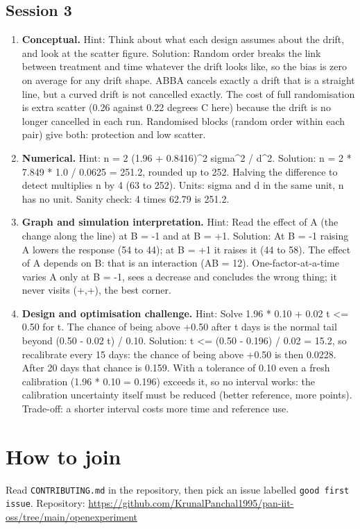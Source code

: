 \documentclass[11pt,a4paper]{article}
\begin{document}
\subsection*{Session 3}
\begin{enumerate}[nosep]
\item \textbf{Conceptual.} Hint: Think about what each design assumes about the drift, and look at the scatter figure. Solution: Random order breaks the link between treatment and time whatever the drift looks like, so the bias is zero on average for any drift shape. ABBA cancels exactly a drift that is a straight line, but a curved drift is not cancelled exactly. The cost of full randomisation is extra scatter (0.26 against 0.22 degrees C here) because the drift is no longer cancelled in each run. Randomised blocks (random order within each pair) give both: protection and low scatter.
\item \textbf{Numerical.} Hint: n = 2 (1.96 + 0.8416)\textasciicircum{}2 sigma\textasciicircum{}2 / d\textasciicircum{}2. Solution: n = 2 * 7.849 * 1.0 / 0.0625 = 251.2, rounded up to 252. Halving the difference to detect multiplies n by 4 (63 to 252). Units: sigma and d in the same unit, n has no unit. Sanity check: 4 times 62.79 is 251.2.
\item \textbf{Graph and simulation interpretation.} Hint: Read the effect of A (the change along the line) at B = -1 and at B = +1. Solution: At B = -1 raising A lowers the response (54 to 44); at B = +1 it raises it (44 to 58). The effect of A depends on B: that is an interaction (AB = 12). One-factor-at-a-time varies A only at B = -1, sees a decrease and concludes the wrong thing; it never visits (+,+), the best corner.
\item \textbf{Design and optimisation challenge.} Hint: Solve 1.96 * 0.10 + 0.02 t \textless{}= 0.50 for t. The chance of being above +0.50 after t days is the normal tail beyond (0.50 - 0.02 t) / 0.10. Solution: t \textless{}= (0.50 - 0.196) / 0.02 = 15.2, so recalibrate every 15 days: the chance of being above +0.50 is then 0.0228. After 20 days that chance is 0.159. With a tolerance of 0.10 even a fresh calibration (1.96 * 0.10 = 0.196) exceeds it, so no interval works: the calibration uncertainty itself must be reduced (better reference, more points). Trade-off: a shorter interval costs more time and reference use.
\end{enumerate}

\section{How to join}
Read \texttt{CONTRIBUTING.md} in the repository, then pick an issue labelled \texttt{good first issue}. Repository: \url{https://github.com/KrunalPanchal1995/pan-iit-oss/tree/main/openexperiment}
\end{document}
